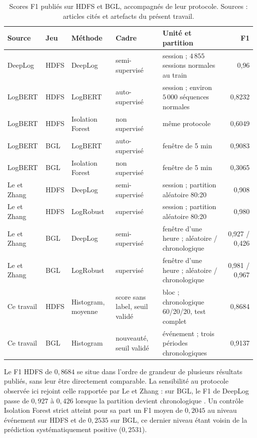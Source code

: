 \begin{table}[H]
\centering
\caption[Résultats publiés sur HDFS et BGL.]{Scores F1 publiés sur HDFS et BGL, accompagnés de leur protocole. Sources : articles cités et artefacts du présent travail.}
\label{tab:baselines-publiees}
\scriptsize
\begin{tabularx}{\textwidth}{p{2.25cm}p{0.80cm}p{1.85cm}p{1.8cm}Xr}
\toprule
\textbf{Source} & \textbf{Jeu} & \textbf{Méthode} & \textbf{Cadre} & \textbf{Unité et partition} & \textbf{F1} \\
\midrule
DeepLog \cite{du2017deeplog} & HDFS & DeepLog & semi-supervisé & session ; $4\,855$ sessions normales au train & 0,96 \\
LogBERT \cite{guo2021logbert} & HDFS & LogBERT & auto-supervisé & session ; environ $5\,000$ séquences normales & 0,8232 \\
LogBERT \cite{guo2021logbert} & HDFS & Isolation Forest & non supervisé & même protocole & 0,6049 \\
LogBERT \cite{guo2021logbert} & BGL & LogBERT & auto-supervisé & fenêtre de 5 min & 0,9083 \\
LogBERT \cite{guo2021logbert} & BGL & Isolation Forest & non supervisé & fenêtre de 5 min & 0,3065 \\
Le et Zhang \cite{le2022logbased} & HDFS & DeepLog & semi-supervisé & session ; partition aléatoire 80:20 & 0,908 \\
Le et Zhang \cite{le2022logbased} & HDFS & LogRobust & supervisé & session ; partition aléatoire 80:20 & 0,980 \\
Le et Zhang \cite{le2022logbased} & BGL & DeepLog & semi-supervisé & fenêtre d'une heure ; aléatoire / chronologique & 0,927 / 0,426 \\
Le et Zhang \cite{le2022logbased} & BGL & LogRobust & supervisé & fenêtre d'une heure ; aléatoire / chronologique & 0,981 / 0,967 \\
\midrule
Ce travail & HDFS & Histogram, moyenne & score sans label, seuil validé & bloc ; chronologique 60/20/20, test complet & 0,8684 \\
Ce travail & BGL & Histogram & nouveauté, seuil validé & événement ; trois périodes chronologiques & 0,9137 \\
\bottomrule
\end{tabularx}
\end{table}

Le F1 HDFS de $0{,}8684$ se situe dans l'ordre de grandeur de plusieurs résultats publiés, sans leur être directement comparable. La sensibilité au protocole observée ici rejoint celle rapportée par Le et Zhang : sur BGL, le F1 de DeepLog passe de $0{,}927$ à $0{,}426$ lorsque la partition devient chronologique \cite{le2022logbased}. Un contrôle Isolation Forest strict atteint pour sa part un F1 moyen de $0{,}2045$ au niveau événement sur HDFS et de $0{,}2535$ sur BGL, ce dernier niveau étant voisin de la prédiction systématiquement positive ($0{,}2531$).


